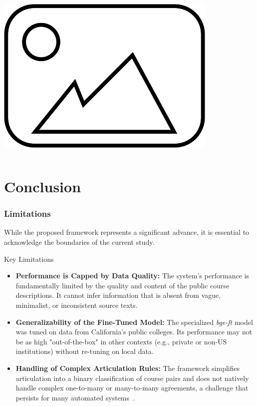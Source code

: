 \documentclass[aspectratio=169,10pt]{beamer}
\begin{document}
\begin{frame}
\begin{columns}[T]
\begin{column}{0.45\textwidth}
            \centering
            \includegraphics[width=0.8\textwidth]{placeholder.png}
            
        \end{column}
    \end{columns}
    
\end{frame}

\section{Conclusion}

\begin{frame}
    \frametitle{Limitations}
    
    While the proposed framework represents a significant advance, it is essential to acknowledge the boundaries of the current study.
    
    \begin{block}{Key Limitations}
        \begin{itemize}
            \item \textbf{Performance is Capped by Data Quality:} The system's performance is fundamentally limited by the quality and content of the public course descriptions. It cannot infer information that is absent from vague, minimalist, or inconsistent source texts.
            
            \item \textbf{Generalizability of the Fine-Tuned Model:} The specialized \textit{bge-ft} model was tuned on data from California's public colleges. Its performance may not be as high "out-of-the-box" in other contexts (e.g., private or non-US institutions) without re-tuning on local data.
            
            \item \textbf{Handling of Complex Articulation Rules:} The framework simplifies articulation into a binary classification of course pairs and does not natively handle complex one-to-many or many-to-many agreements, a challenge that persists for many automated systems~\cite{pardos-articulation-2019}.
        \end{itemize}
    \end{block}
    
\end{frame}
\end{document}
